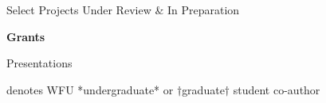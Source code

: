 \documentclass[11pt,letterpaper]{article} %
\begin{document}
\begin{rSection}{ \textrm{Select Projects Under Review \& In Preparation}}

{\large \textbf{Grants}}
\begin{etaremune}

\end{etaremune}%

%

%
\end{rSection}
%
\begin{rSection}{\textrm{Presentations}} %
%
\vspace{-1mm}\begin{center}\footnotesize{denotes WFU *undergraduate* or $\dagger$graduate$\dagger$ student co-author}\end{center}\vspace{-3mm}


\end{rSection}
%
\end{document}

